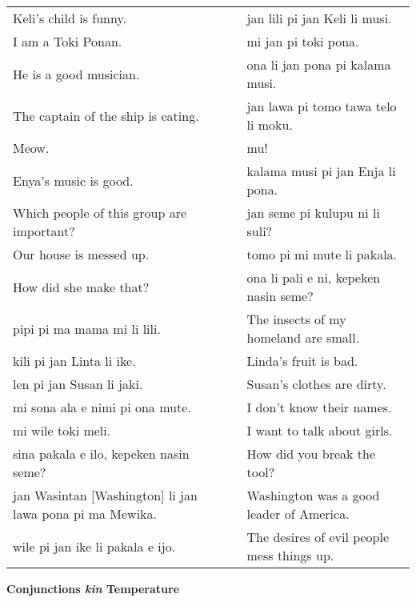 \begin{supertabular}{p{5,5cm}|ll}
Keli's child is funny.  && jan lili pi jan Keli li musi. \\ %
I am a Toki Ponan.  && mi jan pi toki pona. \\ %
He is a good musician.  && ona li jan pona pi kalama musi. \\ %
The captain of the ship is eating.  && jan lawa pi tomo tawa telo li moku. \\ %
Meow.  && mu! \\ %
Enya's music is good.  && kalama musi pi jan Enja li pona. \\ %
Which people of this group are important?  && jan seme pi kulupu ni li suli? \\ %
Our house is messed up.  && tomo pi mi mute li pakala. \\ %
How did she make that?  && ona li pali e ni, kepeken nasin seme? \\ %
pipi pi ma mama mi li lili. && The insects of my homeland are small. \\
kili pi jan Linta li ike.  && Linda's fruit is bad. \\
len pi jan Susan li jaki.  && Susan's clothes are dirty. \\
mi sona ala e nimi pi ona mute.  && I don't know their names. \\
mi wile toki meli.  && I want to talk about girls. \\
sina pakala e ilo, kepeken nasin seme?  && How did you break the tool? \\
jan Wasintan [Washington] li jan lawa pona pi ma Mewika.  && Washington was a good leader of America. \\
wile pi jan ike li pakala e ijo.  && The desires of evil people mess things up. \\
\end{supertabular}  

\textbf{Conjunctions \textit{kin} Temperature} 
\label{'conjunctions_temperature'}

